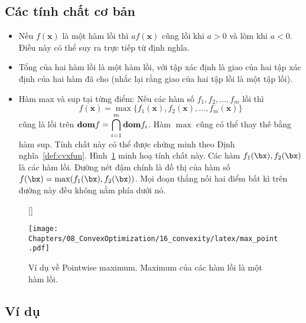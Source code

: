 \subsection{Các tính chất cơ bản}
\label{ssub:16_properties}
\begin{itemize}
    \item Nếu $f(\mathbf{x})$ là một hàm lồi thì $af(\mathbf{x})$ cũng lồi khi $a > 0$ và lõm khi $a < 0$. Điều này có
    thể suy ra trực tiếp từ định nghĩa.
     
    \item Tổng của hai {hàm lồi} là một {hàm lồi}, với tập xác
    định là giao của hai tập xác định của hai hàm đã cho (nhắc lại rằng giao của
    hai tập lồi là một tập lồi).
    \item {Hàm max và sup tại từng điểm}: Nếu các hàm số $f_1, f_2,
    \dots, f_m$ lồi thì
    \begin{equation*} 
    f(\mathbf{x}) = \max\{f_1(\mathbf{x}), f_2(\mathbf{x}), \dots, f_m(\mathbf{x})\} 
    \end{equation*} 
    cũng là lồi trên $\displaystyle \boldsymbol{\mathbf{dom}} f = \bigcap_{i=1}^m \boldsymbol{\mathbf{dom}} f_i$. Hàm $\max$ cũng có thể thay thế bằng hàm
    {sup}. Tính chất này có thể được chứng minh theo
    Định nghĩa~\ref{def:cvxfun}. Hình~\ref{fig:16_max_point} minh hoạ tính chất
    này. Các hàm $f_1(\bx), f_2(\bx)$ là các hàm lồi. Đường nét đậm chính là đồ
    thị của hàm số $f(\bx) = \max(f_1(\bx), f_2(\bx))$. Mọi đoạn thẳng nối hai
    điểm bất kì trên đường này đều {không nằm phía dưới} nó.
 
\end{itemize}

\begin{figure}[t]
    [\FBwidth]
    {\caption{Ví dụ về Pointwise maximum. Maximum của các hàm lồi là một hàm lồi.}
    \label{fig:16_max_point}}
    {\texttt{[image: Chapters/08\_ConvexOptimization/16\_convexity/latex/max\_point.pdf]}}
\end{figure}


\subsection{Ví dụ}
 
